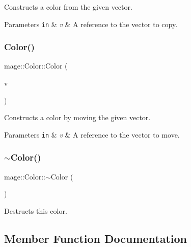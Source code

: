 Constructs a color from the given vector.


\begin{DoxyParams}[1]{Parameters}
\mbox{\tt in}  & {\em v} & A reference to the vector to copy. \\
\hline
\end{DoxyParams}
\hypertarget{structmage_1_1_color_a8f0d0c4359f6754d90bb2b6c077a11e3}{}\label{structmage_1_1_color_a8f0d0c4359f6754d90bb2b6c077a11e3} 
\subsubsection{\texorpdfstring{Color()}{Color()}\hspace{0.1cm}{\footnotesize\ttfamily [6/6]}}
{\footnotesize\ttfamily mage\+::\+Color\+::\+Color (\begin{DoxyParamCaption}\item[{X\+M\+F\+L\+O\+A\+T4 \&\&}]{v }\end{DoxyParamCaption})\hspace{0.3cm}{\ttfamily [explicit]}}

Constructs a color by moving the given vector.


\begin{DoxyParams}[1]{Parameters}
\mbox{\tt in}  & {\em v} & A reference to the vector to move. \\
\hline
\end{DoxyParams}
\hypertarget{structmage_1_1_color_aa4df1c9718b7846adf77fbeed79ac219}{}\label{structmage_1_1_color_aa4df1c9718b7846adf77fbeed79ac219} 
\subsubsection{\texorpdfstring{$\sim$\+Color()}{~Color()}}
{\footnotesize\ttfamily mage\+::\+Color\+::$\sim$\+Color (\begin{DoxyParamCaption}{ }\end{DoxyParamCaption})\hspace{0.3cm}{\ttfamily [default]}}

Destructs this color. 

\subsection{Member Function Documentation}
\hypertarget{structmage_1_1_color_a006c8ce9bf69e54598c5981fe79d742c}{}\label{structmage_1_1_color_a006c8ce9bf69e54598c5981fe79d742c} 
